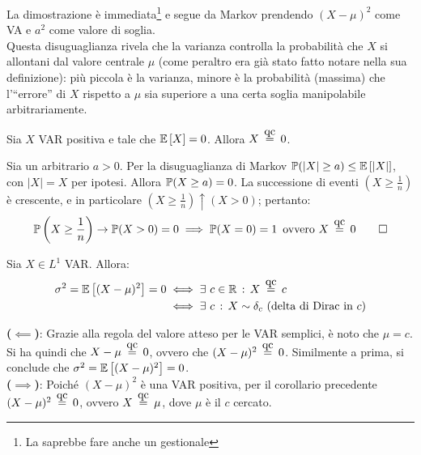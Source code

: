 La dimostrazione è immediata\footnote{La saprebbe fare anche un gestionale} e segue da Markov prendendo $(X-\mu)^2$ come VA e $a^2$ come valore di soglia. \\
Questa disuguaglianza rivela che la varianza controlla la probabilità che $X$ si allontani dal valore centrale $\mu$ (come peraltro era già stato fatto notare nella sua definizione): più piccola è la varianza, minore è la probabilità (massima) che l'``errore'' di $X$ rispetto a $\mu$ sia superiore a una certa soglia manipolabile arbitrariamente.

\smallskip
\begin{coro}\label{coro-markov}
  Sia $X$ VAR positiva e tale che $\mathbb E \left[ X \right] = 0$. Allora $X \aceq 0$.
\end{coro}
\smallskip
\begin{dimo}
  Sia un arbitrario $a > 0$.
  Per la disuguaglianza di Markov $\mathbb P(|X| \geq a) \leq \mathbb E \left[ |X| \right]$, con $|X| = X$ per ipotesi.
  Allora $\mathbb P(X \geq a) = 0$.
  La successione di eventi $\left(X \geq \frac{1}{n}\right)$ è crescente, e in particolare $\left(X \geq \frac{1}{n}\right) \uparrow (X > 0)$; pertanto:
  $$\PP\left(X \geq \frac{1}{n}\right) \to \PP(X > 0) = 0
  \implies \PP(X = 0) = 1 \enspace \text{ovvero } X \aceq 0 \qedhere$$
\end{dimo}

\medskip
\begin{corob}\label{coro-coro-markov}
  Sia $X \in L^1$ VAR. Allora:
  \begin{align*}
  	\sigma^2 = \Ex{(X-\mu)^2} = 0 & \iff \exists \ c \in \RR \, : \, X \aceq c \\
  	& \iff \exists \ c \, : \, X \sim \delta_c \text{ (delta di Dirac in $c$)}
  \end{align*}
\end{corob}
\smallskip
\begin{dimo}
  \textbf{($\impliedby$)}: Grazie alla regola del valore atteso per le VAR semplici, è noto che $\mu=c$. Si ha quindi che $X-\mu \aceq 0$, ovvero che $(X-\mu)^2 \aceq 0$. 
  Similmente a prima, si conclude che $\sigma^2 = \mathbb E \left[ (X-\mu)^2 \right] = 0$. \\
  \textbf{($\implies$)}: Poiché $(X-\mu)^2$ è una VAR positiva, per il corollario precedente $(X-\mu)^2 \aceq 0$, ovvero $X \aceq \mu$, dove $\mu$ è il $c$ cercato.
\end{dimo}

